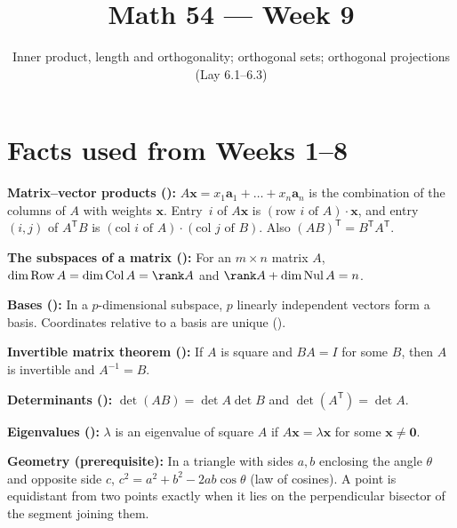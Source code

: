 \documentclass[10pt]{scrartcl}
\title{Math 54 --- Week 9}
\subtitle{Inner product, length and orthogonality; orthogonal sets; orthogonal projections (Lay 6.1--6.3)}
\author{}\date{}\ihead{}
\newcommand{\vv}[1]{\mathbf{#1}}
\begin{document}
\maketitle

\section{Facts used from Weeks 1--8}

\begin{enumerate}[label=(W\arabic*),leftmargin=2.8em,itemsep=4pt]
  \ii {}\textbf{Matrix--vector products ():} $A\vv x=x_1\vv a_1+\dots+x_n\vv a_n$ is the combination of the columns of $A$ with weights $\vv x$. Entry~$i$ of $A\vv x$ is $(\text{row }i\text{ of }A)\cdot\vv x$, and entry~$(i,j)$ of $A^{\mathsf T}B$ is $(\text{col }i\text{ of }A)\cdot(\text{col }j\text{ of }B)$. Also $(AB)^{\mathsf T}=B^{\mathsf T}A^{\mathsf T}$.

  \ii {}\textbf{The subspaces of a matrix ():} For an $m\times n$ matrix $A$, $\dim\Row A=\dim\Col A=\rank A$ and $\rank A+\dim\Nul A=n$.

  \ii {}\textbf{Bases ():} In a $p$-dimensional subspace, $p$ linearly independent vectors form a basis. Coordinates relative to a basis are unique ().

  \ii {}\textbf{Invertible matrix theorem ():} If $A$ is square and $BA=I$ for some $B$, then $A$ is invertible and $A^{-1}=B$.

  \ii {}\textbf{Determinants ():} $\det(AB)=\det A\det B$ and $\det(A^{\mathsf T})=\det A$.

  \ii {}\textbf{Eigenvalues ():} $\lambda$ is an eigenvalue of square $A$ if $A\vv x=\lambda\vv x$ for some $\vv x\neq\vv 0$.

  \ii {}\textbf{Geometry (prerequisite):} In a triangle with sides $a,b$ enclosing the angle $\theta$ and opposite side $c$, $c^2=a^2+b^2-2ab\cos\theta$ (law of cosines). A point is equidistant from two points exactly when it lies on the perpendicular bisector of the segment joining them.
\end{enumerate}
\end{document}

